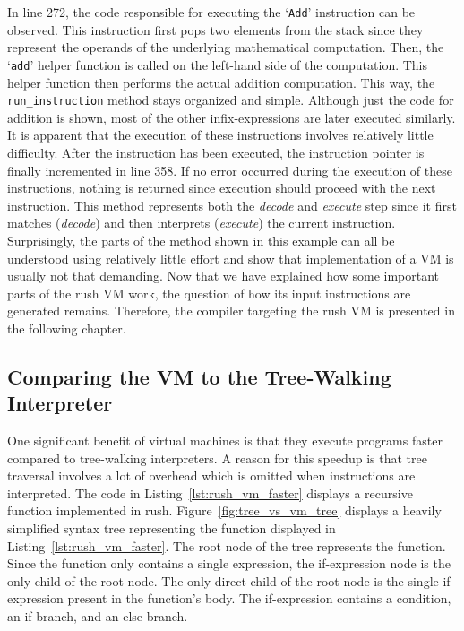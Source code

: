In line 272, the code responsible for executing the `\texttt{Add}' instruction can be observed.
This instruction first pops two elements from the stack since they represent the operands of the underlying mathematical computation.
Then, the `\texttt{add}' helper function is called on the left-hand side of the computation.
This helper function then performs the actual addition computation.
This way, the \texttt{run\_instruction} method stays organized and simple.
Although just the code for addition is shown, most of the other infix-expressions are later executed similarly.
It is apparent that the execution of these instructions involves relatively little difficulty.
After the instruction has been executed, the instruction pointer is finally incremented in line 358.
If no error occurred during the execution of these instructions, nothing is returned since execution should proceed with the next instruction.
This method represents both the \emph{decode} and \emph{execute} step since it first matches (\emph{decode}) and then interprets (\emph{execute}) the current instruction.
Surprisingly, the parts of the method shown in this example can all be understood using relatively little effort and show that implementation of a VM is usually not that demanding.
Now that we have explained how some important parts of the rush VM work, the question of how its input instructions are generated remains.
Therefore, the compiler targeting the rush VM is presented in the following chapter.

\subsection{Comparing the VM to the Tree-Walking Interpreter}

One significant benefit of virtual machines is that they execute programs faster compared to tree-walking interpreters.
A reason for this speedup is that tree traversal involves a lot of overhead which is omitted when instructions are interpreted.
The code in Listing~\ref{lst:rush_vm_faster} displays a recursive function implemented in rush.
Figure~\ref{fig:tree_vs_vm_tree} displays a heavily simplified syntax tree representing the function displayed in Listing~\ref{lst:rush_vm_faster}.
The root node of the tree represents the  function.
Since the function only contains a single expression, the if-expression node is the only child of the root node.
The only direct child of the root node is the single if-expression present in the function's body.
The if-expression contains a condition, an if-branch, and an else-branch.

